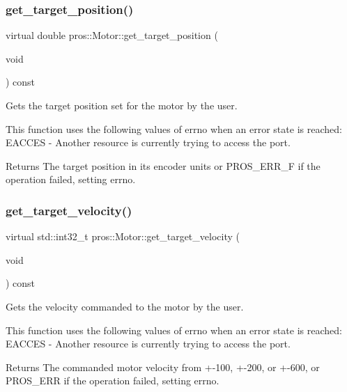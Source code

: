 \subsubsection{\texorpdfstring{get\_target\_position()}{get\_target\_position()}}
{\footnotesize\ttfamily virtual double pros\+::\+Motor\+::get\+\_\+target\+\_\+position (\begin{DoxyParamCaption}\item[{void}]{ }\end{DoxyParamCaption}) const\hspace{0.3cm}{\ttfamily [virtual]}}



Gets the target position set for the motor by the user. 

This function uses the following values of errno when an error state is reached\+: E\+A\+C\+C\+ES -\/ Another resource is currently trying to access the port.

\begin{DoxyReturn}{Returns}
The target position in its encoder units or P\+R\+O\+S\+\_\+\+E\+R\+R\+\_\+F if the operation failed, setting errno. 
\end{DoxyReturn}
\mbox{\label{classpros_1_1Motor_a8b8148a179cfadd579c8d4c82eb5873f}} 
\subsubsection{\texorpdfstring{get\_target\_velocity()}{get\_target\_velocity()}}
{\footnotesize\ttfamily virtual std\+::int32\+\_\+t pros\+::\+Motor\+::get\+\_\+target\+\_\+velocity (\begin{DoxyParamCaption}\item[{void}]{ }\end{DoxyParamCaption}) const\hspace{0.3cm}{\ttfamily [virtual]}}



Gets the velocity commanded to the motor by the user. 

This function uses the following values of errno when an error state is reached\+: E\+A\+C\+C\+ES -\/ Another resource is currently trying to access the port.

\begin{DoxyReturn}{Returns}
The commanded motor velocity from +-\/100, +-\/200, or +-\/600, or P\+R\+O\+S\+\_\+\+E\+RR if the operation failed, setting errno. 
\end{DoxyReturn}
\mbox{\label{classpros_1_1Motor_a9fd793251b91c2ac0091c65f290f740d}} 
